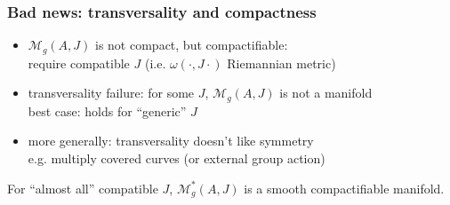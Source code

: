 \begin{frame}
  \frametitle{Bad news: transversality and compactness}
  \begin{itemize}
    \item $\mathcal{M}_g(A,J)$ is not compact, but compactifiable:\\
    require compatible $J$ (i.e. $\omega(\cdot,J\cdot)$ Riemannian metric)
    \item transversality failure: for some $J$, $\mathcal{M}_g(A,J)$ is not a manifold\\
    best case: holds for ``generic'' $J$
    \item more generally: transversality doesn't like symmetry\\
    e.g. multiply covered curves (or external group action)
  \end{itemize}
\begin{theorem}
  For ``almost all'' compatible $J$, $\mathcal{M}^*_g(A,J)$ is a smooth compactifiable manifold.
\end{theorem}
\end{frame}
